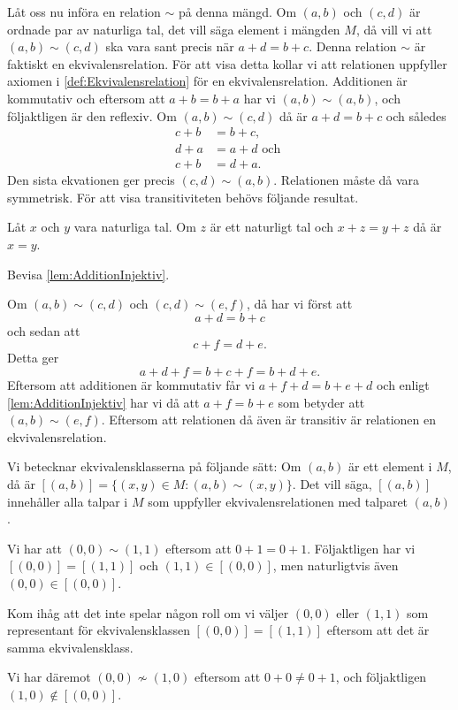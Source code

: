 Låt oss nu införa en relation \(\sim\) på denna mängd.
Om \((a,b)\) och \((c,d)\) är ordnade par av naturliga tal, det vill säga
element i mängden \(M\), då vill vi att \((a,b)\sim (c,d)\) ska vara sant
precis när \(a+d=b+c\).
Denna relation \(\sim\) är faktiskt en ekvivalensrelation.
För att visa detta kollar vi att relationen uppfyller axiomen i
\cref{def:Ekvivalensrelation} för en ekvivalensrelation.
Additionen är kommutativ och eftersom att \(a+b=b+a\) har vi
\((a,b)\sim (a,b)\), och följaktligen är den reflexiv.
Om \((a,b)\sim (c,d)\) då är \(a+d=b+c\) och således 
\begin{align*}
  c+b &= b+c,\\
  d+a &= a+d \text{\ och\ } \\
  c+b &= d+a.
\end{align*}
Den sista ekvationen ger precis \((c,d)\sim (a,b)\).
Relationen måste då vara symmetrisk.
För att visa transitiviteten behövs följande resultat.
\begin{lemma}\label{lem:AdditionInjektiv}
  Låt \(x\) och \(y\) vara naturliga tal.
  Om \(z\) är ett naturligt tal och \(x+z=y+z\) då är \(x=y\).
\end{lemma}
\begin{exercise}
  Bevisa \cref{lem:AdditionInjektiv}.
\end{exercise}
Om \((a,b)\sim (c,d)\) och \((c,d)\sim (e,f)\), då har vi först att
\begin{equation}
  \label{eq:VisaHeltalensEkvivalensrelation1}
  a+d = b+c
\end{equation}
och sedan att
\begin{equation}
  \label{eq:VisaHeltalensEkvivalensrelation2}
  c+f=d+e.
\end{equation}
Detta ger
\begin{equation*}
  a+d+f = b+c+f = b+d+e.
\end{equation*}
Eftersom att additionen är kommutativ får vi \(a+f+d = b+e+d\) och
enligt \cref{lem:AdditionInjektiv} har vi då att \(a+f = b+e\) som
betyder att \((a,b)\sim (e,f)\).
Eftersom att relationen då även är transitiv är relationen en
ekvivalensrelation.

Vi betecknar ekvivalensklasserna på följande sätt:
Om \((a,b)\) är ett element i \(M\), då är
\([(a,b)]=\{(x,y)\in M\colon (a,b)\sim (x,y)\}\).
Det vill säga, \([(a,b)]\) innehåller alla talpar i \(M\) som uppfyller
ekvivalensrelationen med talparet \((a,b)\).
\begin{example}
  Vi har att \((0,0)\sim (1,1)\) eftersom att \(0+1 = 0+1\).
  Följaktligen har vi \([(0,0)]=[(1,1)]\) och \((1,1)\in [(0,0)]\), men
  naturligtvis även \((0,0)\in [(0,0)]\).
\end{example}
\begin{remark}
  Kom ihåg att det inte spelar någon roll om vi väljer \((0,0)\) eller
  \((1,1)\) som representant för
  ekvivalensklassen \([(0,0)]=[(1,1)]\) eftersom att det är samma
  ekvivalensklass.
\end{remark}
\begin{example}
  Vi har däremot \((0,0)\nsim (1,0)\) eftersom att \(0+0\neq 0+1\),
  och följaktligen \((1,0)\notin [(0,0)]\).
\end{example}

